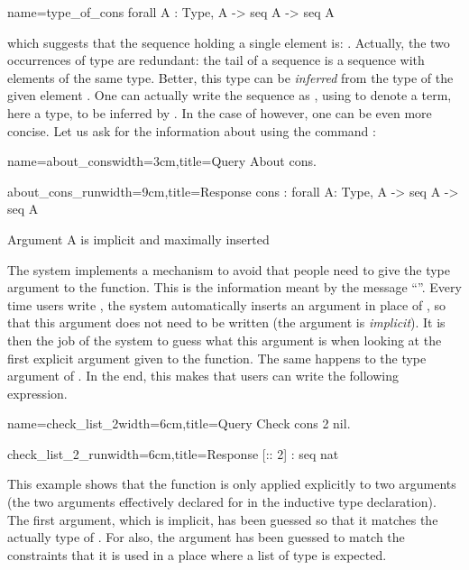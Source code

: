 \begin{coq}{name=type_of_cons}{}
  forall A : Type, A -> seq A -> seq A
\end{coq}
which suggests that the sequence holding a single
element  is: . Actually, the two
occurrences of type  are redundant: the tail of a sequence is a
sequence with elements of the same type. Better, this type can be
\emph{inferred} from the type of the given element . One can
actually write the sequence as  , using \C{_} to
denote  a term, here a type, to be inferred by \Coq{}. In the case of
 however, one can be even more concise. Let us ask for the
information about  using the command :

\begin{coq}{name=about_cons}{width=3cm,title=Query}
About cons.
$~$
$~$
\end{coq}
\begin{coqout}{about_cons_run}{width=9cm,title=Response}
cons : forall A: Type, A -> seq A -> seq A

Argument A is implicit and maximally inserted
\end{coqout}

The \Coq{} system implements a mechanism to avoid that
people need to give the type argument to the  function.  This is
the information meant by the message ``''.  Every time users write , the system automatically
inserts an argument in place of , so that this argument does not
need to be written (the argument is {\em implicit}).  It is then the
job of the \Coq{} system to guess what this argument is when looking at
the first explicit argument given to the function.  The same happens
to the type argument of .  In the end, this makes that users can
write the following expression.

\begin{coq}{name=check_list_2}{width=6cm,title=Query}
Check cons 2 nil.
\end{coq}
\begin{coqout}{check_list_2_run}{width=6cm,title=Response}
[:: 2] : seq nat
\end{coqout}
\index[coq]{\C{(_ :: _)}}
This example shows that the function  is only applied
explicitly to two arguments (the two arguments effectively declared
for  in the inductive type declaration).
The first argument, which is implicit,
has been guessed so that it matches the actually type of .  For
 also, the argument has been guessed to match the constraints
that it is used in a place where a list of type  is expected.


